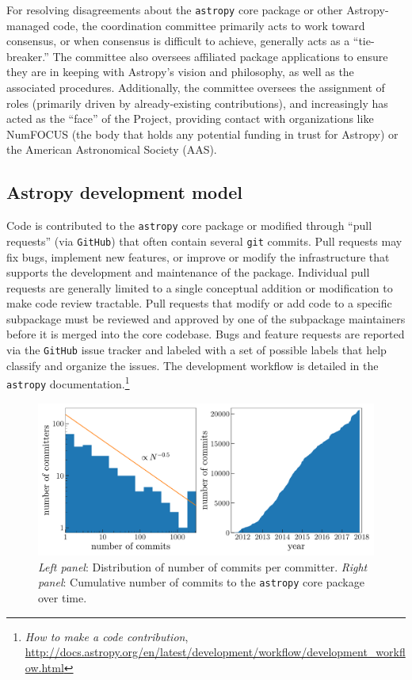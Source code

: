 \documentclass[modern]{aastex61}
\newcommand{\package}[1]{\texttt{#1}\xspace}
\newcommand{\github}{\package{GitHub}}
\newcommand{\astropy}{Astropy\xspace}
\newcommand{\astropypkg}{\package{astropy}}
\begin{document}
For resolving disagreements about the \astropypkg core package or other \astropy-managed code, the coordination committee primarily acts to work toward consensus, or when consensus is difficult to achieve, generally acts as a ``tie-breaker.''
The committee also oversees affiliated package applications to ensure they are in keeping with \astropy's vision and philosophy, as well as the associated procedures.
Additionally, the committee oversees the assignment of roles (primarily driven by already-existing contributions), and increasingly has acted as the ``face'' of the Project, providing contact with organizations like NumFOCUS (the body that holds any potential funding in trust for \astropy) or the American Astronomical Society (AAS).

\subsection{Astropy development model}
Code is contributed to the \astropypkg core package or modified through ``pull
requests'' (via \github) that often contain several \texttt{git} commits.
Pull requests may fix bugs, implement new features, or improve or modify the
infrastructure that supports the development and maintenance of the package.
Individual pull requests are generally limited to a single conceptual addition
or modification to make code review tractable.
Pull requests that modify or add code to a specific subpackage must be reviewed
and approved by one of the subpackage maintainers before it is merged into the
core codebase.
Bugs and feature requests are reported via the \github issue tracker and labeled
with a set of possible labels that help classify and organize the issues.
The development workflow is detailed in the \astropypkg
documentation.\footnote{\emph{How to make a code contribution},
\url{http://docs.astropy.org/en/latest/development/workflow/development_workflow.html}}

\begin{figure}
\includegraphics[width=\textwidth]{ncommits.pdf}
\caption{%
    \emph{Left panel}: Distribution of number of commits per committer.
    \emph{Right panel}: Cumulative number of commits to the \astropypkg core
    package over time.
    \label{fig:ncommits}
}
\end{figure}
\end{document}
